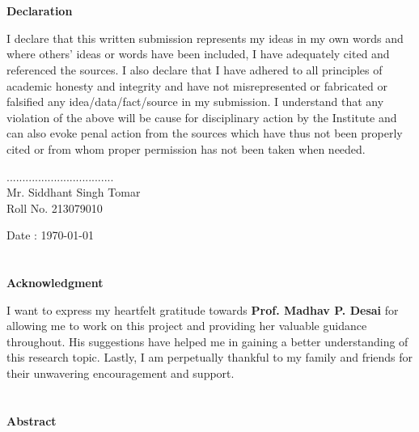 \documentclass[12pt]{report}
\begin{document}
\chapter*{}
\begin{center}
{\Large \textbf{Declaration}}
\end{center}
\bigskip
\bigskip
\bigskip
I declare that this written submission represents my ideas in my own words and where
others' ideas or words have been included, I have adequately cited and referenced the sources.  
I also declare that I have adhered to all principles of academic honesty and integrity
and   have   not   misrepresented   or   fabricated   or   falsified   any   idea/data/fact/source   in   my
submission.  I understand that any violation of the above will be cause for disciplinary action
by the Institute and can also evoke  penal action from the sources which have thus not been
properly cited or from whom proper permission has not been taken when needed.\\
\bigskip
\bigskip
\bigskip
\begin{flushleft}
..................................\\
{Mr. Siddhant Singh Tomar\\
Roll No. 213079010}
\end{flushleft}

\begin{flushleft}
{Date : \today}
\end{flushleft}

\newpage

\chapter*{}
\begin{center}
{\Large \textbf{Acknowledgment}}
\end{center}
I want to express my heartfelt gratitude towards \textbf{Prof. Madhav P. Desai} for allowing me to work on this project and providing her valuable guidance throughout. His suggestions have helped me in gaining a better understanding of this research topic. Lastly, I am perpetually thankful to my family and friends for their unwavering encouragement and support.

\newpage

\chapter*{}
\begin{center}
{\Large \textbf{Abstract}}
\end{center}
\end{document}
